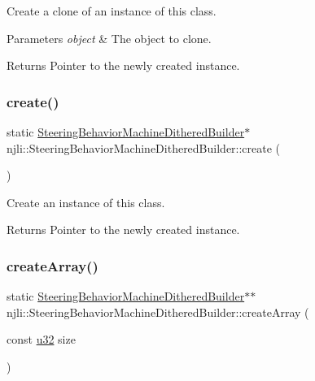 Create a clone of an instance of this class.


\begin{DoxyParams}{Parameters}
{\em object} & The object to clone.\\
\hline
\end{DoxyParams}
\begin{DoxyReturn}{Returns}
Pointer to the newly created instance. 
\end{DoxyReturn}
\mbox{\label{classnjli_1_1_steering_behavior_machine_dithered_builder_acd55bdeaaf63d843f4d266a382c62938}} 
\subsubsection{\texorpdfstring{create()}{create()}}
{\footnotesize\ttfamily static \mbox{\hyperlink{classnjli_1_1_steering_behavior_machine_dithered_builder}{Steering\+Behavior\+Machine\+Dithered\+Builder}}$\ast$ njli\+::\+Steering\+Behavior\+Machine\+Dithered\+Builder\+::create (\begin{DoxyParamCaption}{ }\end{DoxyParamCaption})\hspace{0.3cm}{\ttfamily [static]}}

Create an instance of this class.

\begin{DoxyReturn}{Returns}
Pointer to the newly created instance. 
\end{DoxyReturn}
\mbox{\label{classnjli_1_1_steering_behavior_machine_dithered_builder_af8c396516d167e3e7f7f1395383e9dcd}} 
\subsubsection{\texorpdfstring{create\+Array()}{createArray()}}
{\footnotesize\ttfamily static \mbox{\hyperlink{classnjli_1_1_steering_behavior_machine_dithered_builder}{Steering\+Behavior\+Machine\+Dithered\+Builder}}$\ast$$\ast$ njli\+::\+Steering\+Behavior\+Machine\+Dithered\+Builder\+::create\+Array (\begin{DoxyParamCaption}\item[{const \mbox{\hyperlink{_util_8h_a10e94b422ef0c20dcdec20d31a1f5049}{u32}}}]{size }\end{DoxyParamCaption})\hspace{0.3cm}{\ttfamily [static]}}

